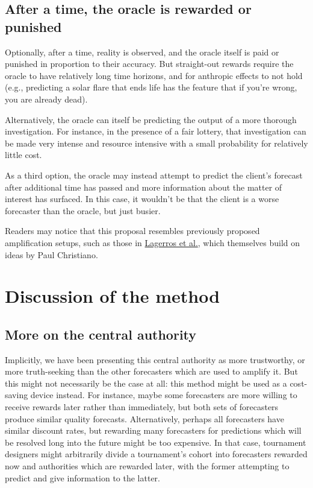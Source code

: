 \documentclass[]{article}
\begin{document}
\hypertarget{after-a-time-the-oracle-is-rewarded-or-punished}{%
\subsection{After a time, the oracle is rewarded or
punished}\label{after-a-time-the-oracle-is-rewarded-or-punished}}

Optionally, after a time, reality is observed, and the oracle itself is
paid or punished in proportion to their accuracy. But straight-out
rewards require the oracle to have relatively long time horizons, and
for anthropic effects to not hold (e.g., predicting a solar flare that
ends life has the feature that if you're wrong, you are already dead).

Alternatively, the oracle can itself be predicting the output of a more
thorough investigation. For instance, in the presence of a fair lottery,
that investigation can be made very intense and resource intensive with
a small probability for relatively little cost.

As a third option, the oracle may instead attempt to predict the
client's forecast after additional time has passed and more information
about the matter of interest has surfaced. In this case, it wouldn't be
that the client is a worse forecaster than the oracle, but just busier.

Readers may notice that this proposal resembles previously proposed
amplification setups, such as those in
\href{https://www.lesswrong.com/posts/cLtdcxu9E4noRSons}{Lagerros et
al.}, which themselves build on ideas by Paul Christiano.

\hypertarget{discussion-of-the-method}{%
\section{Discussion of the method}\label{discussion-of-the-method}}

\hypertarget{more-on-the-central-authority}{%
\subsection{More on the central
authority}\label{more-on-the-central-authority}}

Implicitly, we have been presenting this central authority as more
trustworthy, or more truth-seeking than the other forecasters which are
used to amplify it. But this might not necessarily be the case at all:
this method might be used as a cost-saving device instead. For instance,
maybe some forecasters are more willing to receive rewards later rather
than immediately, but both sets of forecasters produce similar quality
forecasts. Alternatively, perhaps all forecasters have similar discount
rates, but rewarding many forecasters for predictions which will be
resolved long into the future might be too expensive. In that case,
tournament designers might arbitrarily divide a tournament's cohort into
forecasters rewarded now and authorities which are rewarded later, with
the former attempting to predict and give information to the latter.
\end{document}
